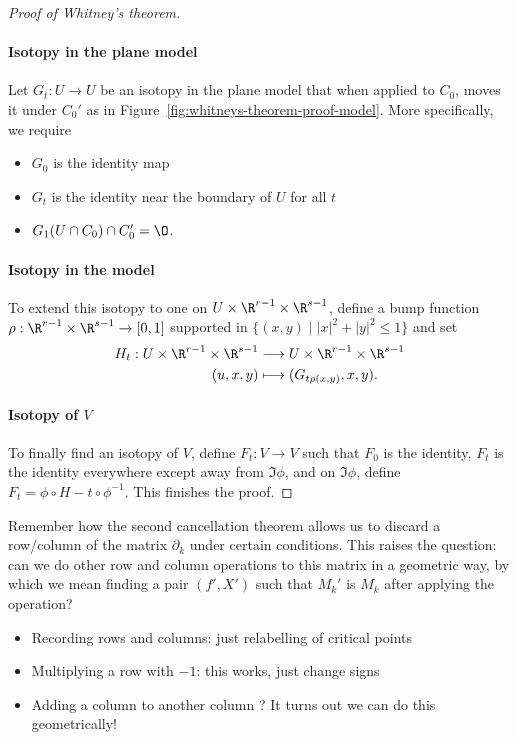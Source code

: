 \begin{proof}[Proof of Whitney's theorem]
    \paragraph{Isotopy in the plane model}
    Let $G_t: U \to U$ be an isotopy in the plane model that when applied to $C_0$, moves it under $C_0'$ as in Figure~\ref{fig:whitneys-theorem-proof-model}.
    More specifically, we require
    \begin{itemize}
        \item $G_0$ is the identity map
        \item $G_t$ is the identity near the boundary of  $U$ for all $t$
        \item  $ G_1(U \cap C_0) \cap C_0' = \O$.
    \end{itemize}
    \paragraph{Isotopy in the model}
    To extend this isotopy to one on $U \times \R^{r-1} \times \R^{s-1}$, define a bump function $\rho: \R^{r-1}\times \R^{s-1} \to  [0,1]$ supported in $\{(x, y)  \mid |x|^2 + |y|^2 \le  1\}$ and set
    \begin{align*}
        H_t: U \times \R^{r-1}\times \R^{s-1} &\longrightarrow  U \times \R^{r-1} \times \R^{s-1}\\
        (u, x, y) &\longmapsto (G_{t \rho(x, y)}, x, y)
    .\end{align*}
    \paragraph{Isotopy of $V$}
    To finally find an isotopy of $V$, define $F_t: V\to V$ such that
    $F_0$ is the identity, $F_t$ is the identity everywhere except away from  $\Im \phi$, and on  $\Im \phi$, define  $F_t = \phi  \circ  H-t  \circ  \phi^{-1}$.
    This finishes the proof.
\end{proof}

Remember how the second cancellation theorem allows us to discard a row/column of the matrix $\partial_k$ under certain conditions.  This raises the question: can we do other row and column operations to this matrix in a geometric way, by which we mean finding a pair $(f', X')$ such that  $M_k'$ is $M_k$ after applying the operation?

\begin{itemize}
    \item Recording rows and columns: just relabelling of critical points
    \item Multiplying a row with $-1$: this works, just change signs
    \item Adding a column to another column ?
        It turns out we can do this geometrically!
\end{itemize}

